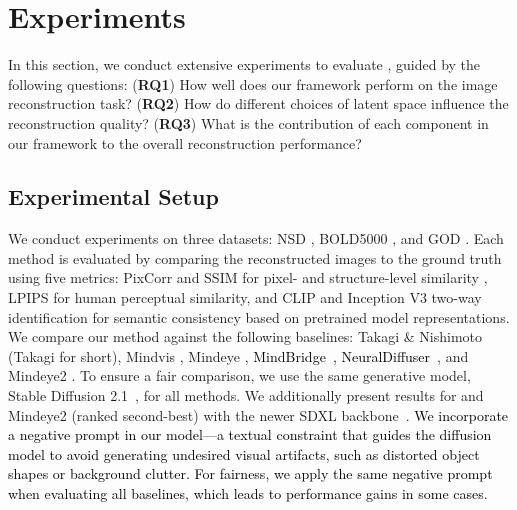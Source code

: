 \section{Experiments}
\label{sec:exp}

In this section, we conduct extensive experiments to evaluate \prism, guided by the following questions: 
(\textbf{RQ1}) How well does our framework \prism perform on the image reconstruction task? (\textbf{RQ2}) How do different choices of latent space influence the reconstruction quality? (\textbf{RQ3}) What is the contribution of each component in our framework to the overall reconstruction performance?

\subsection{Experimental Setup}
We conduct experiments on three datasets: NSD \citep{allen2022massive}, BOLD5000 \citep{chang2019bold5000}, and GOD \citep{horikawa2017generic}. Each method is evaluated by comparing the reconstructed images to the ground truth using five metrics: PixCorr and SSIM for pixel- and structure-level similarity \citep{wang2004image}, LPIPS \citep{zhang2018unreasonable} for human perceptual similarity, and CLIP and Inception V3 two-way identification \citep{scotti2024mindeye2} for semantic consistency based on pretrained model representations.
We compare our method against the following baselines: Takagi \& Nishimoto \citep{takagi2023high} (Takagi for short), Mindvis \citep{chen2023seeing}, Mindeye \citep{scotti2023reconstructing}, \textcolor{black}{MindBridge~\citep{wang2024mindbridge}, NeuralDiffuser~\citep{li2025neuraldiffuser}}, and Mindeye2 \citep{scotti2024mindeye2}. To ensure a fair comparison, we use the same generative model, Stable Diffusion 2.1~\citep{pernias2023wurstchen, rombach2022high}, for all methods. We additionally present results for \prism and Mindeye2 (ranked second-best) with the newer SDXL backbone~\citep{podell2023sdxl}. \textcolor{black}{We incorporate a negative prompt in our model—a textual constraint that guides the diffusion model to avoid generating undesired visual artifacts, such as distorted object shapes or background clutter. For fairness, we apply the same negative prompt when evaluating all baselines, which leads to performance gains in some cases.}







